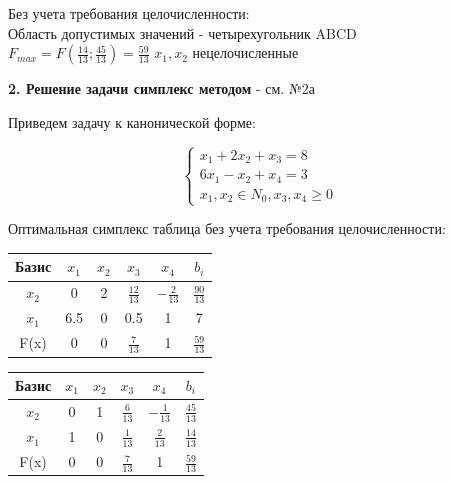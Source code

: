 Без учета требования целочисленности:\\
Область допустимых значений - четырехугольник ABCD\\
$F_{max} = F(\frac{14}{13}; \frac{45}{13}) = \frac{59}{13}$
$x_1, x_2$ нецелочисленные\\

\begin{flushleft}
    {\bf2. Решение задачи симплекс методом} - см. №2а\\
\end{flushleft}

\begin{flushleft}
Приведем задачу к канонической форме:
\end{flushleft}

\begin{equation*}
    \begin{cases}
        x_1 + 2x_2 + x_3 = 8 \\
        6x_1 - x_2 + x_4 = 3 \\
        x_1, x_2 \in N_0, x_3, x_4 \ge 0
    \end{cases}
\end{equation*}

Оптимальная симплекс таблица без учета требования целочисленности:

\begin{center}
    \begin{tabular}{|c | c c c c c|} 
         \hline
            Базис & $x_1$ & $x_2$ & $x_3$ & $x_4$ & $b_i$\\
         \hline
            $x_2$ & 0 & 2 & $\frac{12}{13}$ & $-\frac{2}{13}$ & $\frac{90}{13}$\\
         \hline
            $x_1$ & 6.5 & 0 & 0.5 & 1 & 7\\
         \hline
            F(x) & 0 & 0 & $\frac{7}{13}$ & 1 & $\frac{59}{13}$\\
         \hline
    \end{tabular}
\end{center}

\begin{center}
    \begin{tabular}{|c | c c c c c|} 
         \hline
            Базис & $x_1$ & $x_2$ & $x_3$ & $x_4$ & $b_i$\\
         \hline
            $x_2$ & 0 & 1 & $\frac{6}{13}$ & $-\frac{1}{13}$ & $\frac{45}{13}$\\
         \hline
            $x_1$ & 1 & 0 & $\frac{1}{13}$ & $\frac{2}{13}$ & $\frac{14}{13}$\\
         \hline
            F(x) & 0 & 0 & $\frac{7}{13}$ & 1 & $\frac{59}{13}$\\
         \hline
    \end{tabular}
\end{center}

